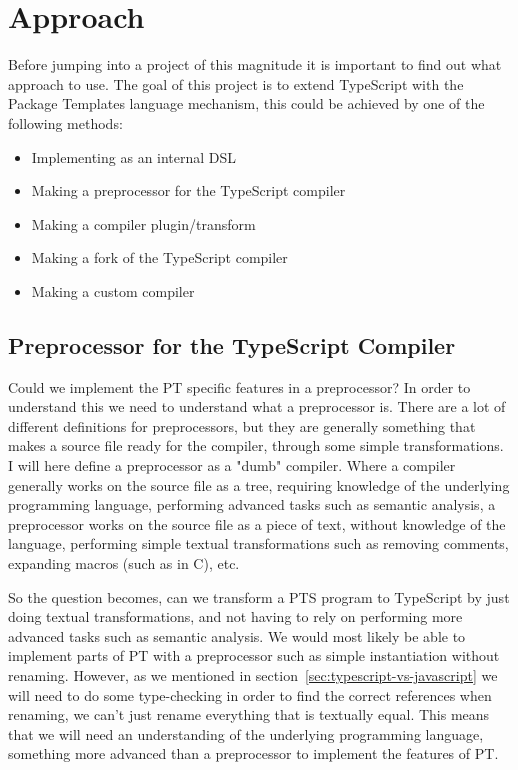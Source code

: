 \section{Approach}\label{sec:choosing-the-right-approach}

Before jumping into a project of this magnitude it is important to find out what approach to use. 
The goal of this project is to extend TypeScript with the Package Templates language mechanism, this could be achieved by one of the following methods:

\begin{itemize}
    \item Implementing as an internal DSL
    \item Making a preprocessor for the TypeScript compiler
    \item Making a compiler plugin/transform
    \item Making a fork of the TypeScript compiler
    \item Making a custom compiler
\end{itemize}



\subsection{Preprocessor for the TypeScript Compiler}\label{subsec:preprocessor-for-the-typescript-compiler}

Could we implement the PT specific features in a preprocessor?
In order to understand this we need to understand what a preprocessor is.
There are a lot of different definitions for preprocessors, but they are generally something that makes a source file ready for the compiler, through some simple transformations.
I will here define a preprocessor as a "dumb" compiler.
Where a compiler generally works on the source file as a tree, requiring knowledge of the underlying programming language, performing advanced tasks such as semantic analysis, a preprocessor works on the source file as a piece of text, without knowledge of the language, performing simple textual transformations such as removing comments, expanding macros (such as  in C), etc.

So the question becomes, can we transform a PTS program to TypeScript by just doing textual transformations, and not having to rely on performing more advanced tasks such as semantic analysis.
We would most likely be able to implement parts of PT with a preprocessor such as simple instantiation without renaming.
However, as we mentioned in section~\vref{sec:typescript-vs-javascript} we will need to do some type-checking in order to find the correct references when renaming, we can't just rename everything that is textually equal.
This means that we will need an understanding of the underlying programming language, something more advanced than a preprocessor to implement the features of PT\@.

